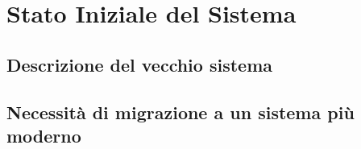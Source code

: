 \chapter{Stato Iniziale del Sistema}
\label{cha:stato_iniziale}

\section{Descrizione del vecchio sistema}
\label{sec:vecchio_sistema}

\lipsum[1]

\section{Necessità di migrazione a un sistema più moderno}
\label{sec:necessita_di_migrazione}

\lipsum[1]
